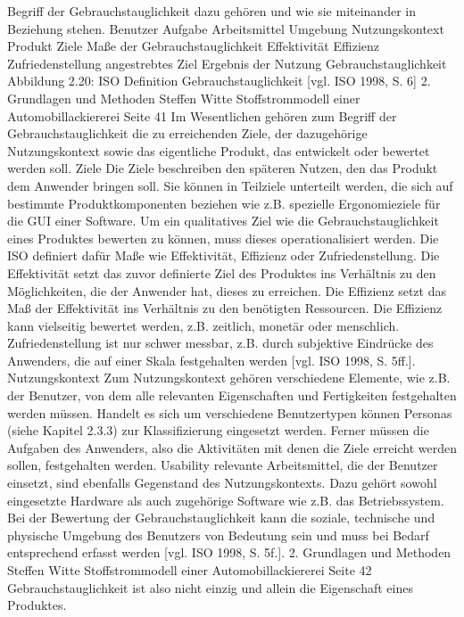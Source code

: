 \documentclass[a4paper, 12pt, twoside, BCOR=20mm, DIV=calc, abstracton, parskip=half*, toc=bibliography, toc=listof, headsepline, footsepline, headings=small, numbers=enddot]{scrreprt}
\begin{document}
Begriff der Gebrauchstauglichkeit dazu gehören und wie sie miteinander in Beziehung
stehen.
Benutzer
Aufgabe
Arbeitsmittel
Umgebung
Nutzungskontext
Produkt
Ziele
Maße der
Gebrauchstauglichkeit
Effektivität
Effizienz
Zufriedenstellung
angestrebtes Ziel
Ergebnis
der Nutzung
Gebrauchstauglichkeit
Abbildung 2.20: ISO Definition Gebrauchstauglichkeit [vgl. ISO 1998, S. 6]
2. Grundlagen und Methoden
Steffen Witte Stoffstrommodell einer Automobillackiererei Seite 41
Im Wesentlichen gehören zum Begriff der Gebrauchstauglichkeit die zu erreichenden
Ziele, der dazugehörige Nutzungskontext sowie das eigentliche Produkt, das entwickelt
oder bewertet werden soll.
Ziele
Die Ziele beschreiben den späteren Nutzen, den das Produkt dem Anwender bringen
soll. Sie können in Teilziele unterteilt werden, die sich auf bestimmte Produktkomponenten
beziehen wie z.B. spezielle Ergonomieziele für die GUI einer Software. Um
ein qualitatives Ziel wie die Gebrauchstauglichkeit eines Produktes bewerten zu können,
muss dieses operationalisiert werden. Die ISO definiert dafür Maße wie Effektivität,
Effizienz oder Zufriedenstellung. Die Effektivität setzt das zuvor definierte Ziel
des Produktes ins Verhältnis zu den Möglichkeiten, die der Anwender hat, dieses zu
erreichen. Die Effizienz setzt das Maß der Effektivität ins Verhältnis zu den benötigten
Ressourcen. Die Effizienz kann vielseitig bewertet werden, z.B. zeitlich, monetär
oder menschlich. Zufriedenstellung ist nur schwer messbar, z.B. durch subjektive
Eindrücke des Anwenders, die auf einer Skala festgehalten werden [vgl. ISO 1998,
S. 5ff.].
Nutzungskontext
Zum Nutzungskontext gehören verschiedene Elemente, wie z.B. der Benutzer, von
dem alle relevanten Eigenschaften und Fertigkeiten festgehalten werden müssen.
Handelt es sich um verschiedene Benutzertypen können Personas (siehe Kapitel
2.3.3) zur Klassifizierung eingesetzt werden. Ferner müssen die Aufgaben des Anwenders,
also die Aktivitäten mit denen die Ziele erreicht werden sollen, festgehalten
werden. Usability relevante Arbeitsmittel, die der Benutzer einsetzt, sind ebenfalls
Gegenstand des Nutzungskontexts. Dazu gehört sowohl eingesetzte Hardware als
auch zugehörige Software wie z.B. das Betriebssystem. Bei der Bewertung der
Gebrauchstauglichkeit kann die soziale, technische und physische Umgebung des
Benutzers von Bedeutung sein und muss bei Bedarf entsprechend erfasst werden
[vgl. ISO 1998, S. 5f.].
2. Grundlagen und Methoden
Steffen Witte Stoffstrommodell einer Automobillackiererei Seite 42
Gebrauchstauglichkeit ist also nicht einzig und allein die Eigenschaft eines Produktes.
\end{document}
